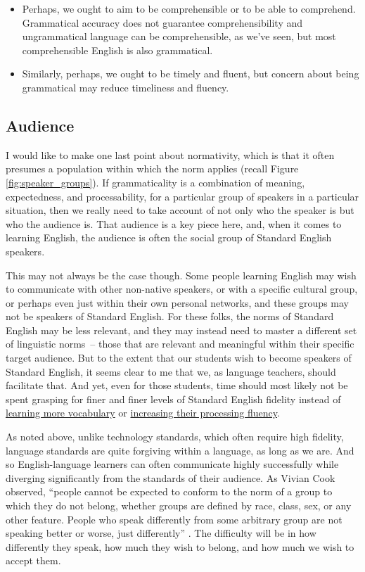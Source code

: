 \begin{itemize}[noitemsep]
    \item Perhaps, we ought to aim to be comprehensible or to be able to comprehend. Grammatical accuracy does not guarantee comprehensibility and ungrammatical language can be comprehensible, as we've seen, but most comprehensible English is also grammatical.
    \item Similarly, perhaps, we ought to be timely and fluent, but concern about being grammatical may reduce timeliness and fluency.
\end{itemize}

\subsection{Audience}

I would like to make one last point about normativity, which is that it often presumes a population within which the norm applies (recall Figure \ref{fig:speaker_groups}). If grammaticality is a combination of meaning, expectedness, and processability, for a particular group of speakers in a particular situation, then we really need to take account of not only who the speaker is but who the audience is. That audience is a key piece here, and, when it comes to learning English, the audience is often the social group of Standard English speakers.

This may not always be the case though. Some people learning English may wish to communicate with other non-native speakers, or with a specific cultural group, or perhaps even just within their own personal networks, and these groups may not be speakers of Standard English. For these folks, the norms of Standard English may be less relevant, and they may instead need to master a different set of linguistic norms~-- those that are relevant and meaningful within their specific target audience. But to the extent that our students wish to become speakers of Standard English, it seems clear to me that we, as language teachers, should facilitate that. And yet, even for those students, time should most likely not be spent grasping for finer and finer levels of Standard English fidelity instead of \hyperref[ch:vocabulary]{learning more vocabulary} or \hyperref[ch:fluency]{increasing their processing fluency}. 

As noted above, unlike technology standards, which often require high fidelity, language standards are quite forgiving within a language, as long as we are. And so English-language learners can often communicate highly successfully while diverging significantly from the standards of their audience. As Vivian Cook observed, ``people cannot be expected to conform to the norm of a group to which they do not belong, whether groups are defined by race, class, sex, or any other feature. People who speak differently from some arbitrary group are not speaking better or worse, just differently'' \citep[194]{Cook1999}. The difficulty will be in how differently they speak, how much they wish to belong, and how much we wish to accept them.

